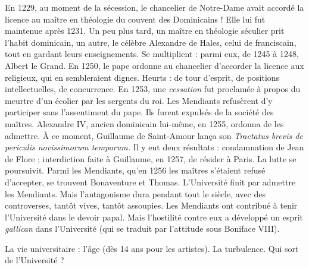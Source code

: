 \documentclass[french,twoside]{book} %
\begin{document}
\noindent  {}
\label{p118} En 1229, au moment de la sécession, le chancelier de Notre-Dame avait accordé la licence au maître en théologie du couvent des Dominicains ! Elle lui fut maintenue après 1231. Un peu plus tard, un maître en théologie séculier prit l’habit dominicain, un autre, le célèbre Alexandre de Hales, celui de franciscain, tout en gardant leurs enseignements. Se multiplient : parmi eux, de 1245 à 1248, Albert le Grand. En 1250, le pape ordonne au chancelier d’accorder la licence aux religieux, qui en sembleraient dignes. Heurts : de tour d’esprit, de positions intellectuelles, de concurrence. En 1253, une \emph{cessation} fut proclamée à propos du meurtre d’un écolier par les sergents du roi. Les Mendiants refusèrent d’y participer sans l’assentiment du pape. Ils furent expulsés de la société des maîtres. Alexandre IV, ancien dominicain lui-même, en 1255, ordonna de les admettre. À ce moment, Guillaume de Saint-Amour lança son {\itshape Tractatus brevis de periculis novissimorum temporum.} Il y eut deux résultats : condamnation de Jean de Flore ; interdiction faite à Guillaume, en 1257, de résider à Paris. La lutte se poursuivit. Parmi les Mendiants, qu’en 1256 les maîtres s’étaient refusé d’accepter, se trouvent Bonaventure et Thomas. L’Université finit par admettre les Mendiants. Mais l’antagonisme dura pendant tout le siècle, avec des controverses, tantôt vives, tantôt assoupies. Les Mendiants ont contribué à tenir l’Université dans le devoir papal. Mais l’hostilité contre eux a développé un esprit \emph{gallican} dans l’Université (qui se traduit par l’attitude sous Boniface VIII).\par
La vie universitaire : l’âge (dès 14 ans pour les artistes). La turbulence. Qui sort de l’Université ?
\end{document}
